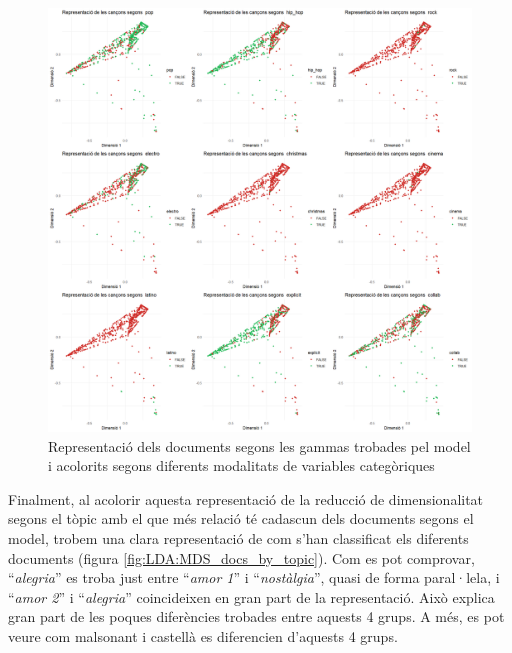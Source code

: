 \begin{figure}[H]
    \centering
    \includegraphics[width=0.95\linewidth]{Images/8_Textual/LDA/MDS_docs_filtered.png}
    \caption{Representació dels documents segons les gammas trobades pel model i acolorits segons diferents modalitats de variables categòriques}
    \label{fig:LDA:MDS_docs_filtered}
\end{figure}

Finalment, al acolorir aquesta representació de la reducció de dimensionalitat segons el tòpic amb el que més relació té cadascun dels documents segons el model, trobem una clara representació de com s'han classificat els diferents documents (figura \ref{fig:LDA:MDS_docs_by_topic}). Com es pot comprovar, ``\textit{alegria}'' es troba just entre ``\textit{amor 1}'' i ``\textit{nostàlgia}'', quasi de forma paral·lela, i ``\textit{amor 2}'' i ``\textit{alegria}'' coincideixen en gran part de la representació. Això explica gran part de les poques diferències trobades entre aquests 4 grups. A més, es pot veure com malsonant i castellà es diferencien d'aquests 4 grups.

